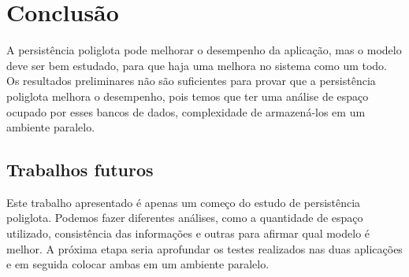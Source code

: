 \chapter{Conclusão}
\label{chap:conclusao}

A persistência poliglota pode melhorar o desempenho da aplicação, mas o modelo deve ser bem estudado, para que haja uma melhora no sistema como um todo. Os resultados preliminares não são suficientes para provar que a persistência poliglota melhora o desempenho, pois temos que ter uma análise de espaço ocupado por esses bancos de dados, complexidade de armazená-los em um ambiente paralelo.


\section{Trabalhos futuros}
\label{sec:trabalhosFuturos}

Este trabalho apresentado é apenas um começo do estudo de persistência poliglota. Podemos fazer diferentes análises, como a quantidade de espaço utilizado, consistência das informações e outras para afirmar qual modelo é melhor. A próxima etapa seria aprofundar os testes realizados nas duas aplicações e em seguida colocar ambas em um ambiente paralelo.


